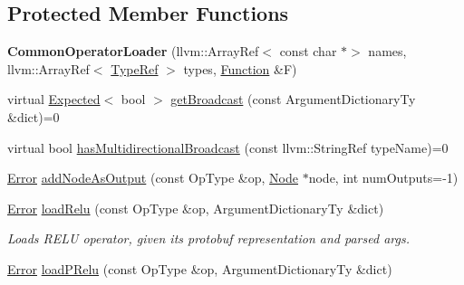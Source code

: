 \subsection*{Protected Member Functions}
\begin{DoxyCompactItemize}
\item 
\mbox{\label{classglow_1_1_common_operator_loader_a46ea6e13ae818fc629fba133602e71d4}} 
{\bfseries Common\+Operator\+Loader} (llvm\+::\+Array\+Ref$<$ const char $\ast$$>$ names, llvm\+::\+Array\+Ref$<$ \hyperlink{structglow_1_1_type}{Type\+Ref} $>$ types, \hyperlink{classglow_1_1_function}{Function} \&F)
\item 
virtual \hyperlink{classglow_1_1detail_1_1_glow_expected}{Expected}$<$ bool $>$ \hyperlink{classglow_1_1_common_operator_loader_ac5ce8fc378bb2526f7f957e13a54e970}{get\+Broadcast} (const Argument\+Dictionary\+Ty \&dict)=0
\item 
virtual bool \hyperlink{classglow_1_1_common_operator_loader_a4e079eed244e7047b09040ca209d15e0}{has\+Multidirectional\+Broadcast} (const llvm\+::\+String\+Ref type\+Name)=0
\item 
\hyperlink{namespaceglow_afdb176c3a672ef66db0ecfc19a8d39bf}{Error} \hyperlink{classglow_1_1_common_operator_loader_ab759aea69c4a85d95d1fbd6ed068618b}{add\+Node\+As\+Output} (const Op\+Type \&op, \hyperlink{classglow_1_1_node}{Node} $\ast$node, int num\+Outputs=-\/1)
\item 
\mbox{\label{classglow_1_1_common_operator_loader_a8eeda567e0c5df45b32c99c394cb6659}} 
\hyperlink{namespaceglow_afdb176c3a672ef66db0ecfc19a8d39bf}{Error} \hyperlink{classglow_1_1_common_operator_loader_a8eeda567e0c5df45b32c99c394cb6659}{load\+Relu} (const Op\+Type \&op, Argument\+Dictionary\+Ty \&dict)
\begin{DoxyCompactList}\small\item\em Loads R\+E\+LU operator, given its protobuf representation and parsed args. \end{DoxyCompactList}\item 
\hyperlink{namespaceglow_afdb176c3a672ef66db0ecfc19a8d39bf}{Error} \hyperlink{classglow_1_1_common_operator_loader_a6a8b5b3d78eab3af16b88b718aeb40c5}{load\+P\+Relu} (const Op\+Type \&op, Argument\+Dictionary\+Ty \&dict)
\item 
\mbox{\label{classglow_1_1_common_operator_loader_a322400cd9a5d0395d243456dd02779ad}} 
$$
\end{DoxyCompactItemize}
